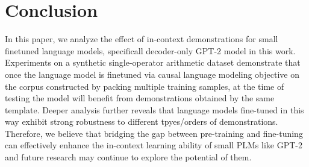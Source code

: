 \section{Conclusion}
In this paper, we analyze the effect of in-context demonstrations for small finetuned language models, specificall decoder-only GPT-2 model in this work. Experiments on a synthetic single-operator arithmetic dataset demonstrate that 
once the language model is finetuned via causal language modeling objective on the corpus constructed by packing multiple training samples, at the time of testing the model will benefit from demonstrations obtained by the same template. Deeper analysis further reveals that language models fine-tuned in this way exhibit strong robustness to 
different tpyes/orders of demonstrations. Therefore, we believe that bridging the gap between pre-training and fine-tuning can effectively enhance the in-context learning ability of small PLMs like GPT-2 and future research may continue to explore the potential of them.
